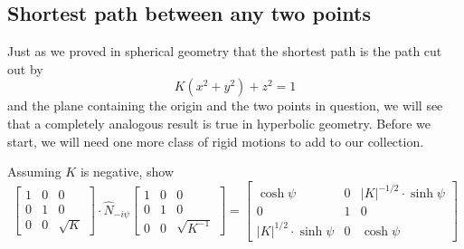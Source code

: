 \documentclass[handout,newpage,hints,,12pt,noauthor,nooutcomes]{ximera}
\begin{document}
\subsection{Shortest path between any two points}

Just as we proved in spherical geometry that the shortest path is the
path cut out by
\[
K(x^{2}+y^{2})+z^{2}=1
\]
and the plane containing the origin and the two points in question, we
will see that a completely analogous result is true in hyperbolic
geometry. Before we start, we will need one more class of rigid
motions to add to our collection.


\begin{problem}
  Assuming $K$ is negative, show
  \[
  \begin{bmatrix}
    1 & 0 & 0 \\
    0 & 1 & 0 \\
    0 & 0 & \sqrt{K}
  \end{bmatrix}
  \cdot 
  \hat N_{-i\psi}
  \begin{bmatrix}
    1 & 0 & 0 \\
    0 & 1 & 0\\
    0 & 0 & \sqrt{K^{-1}}
  \end{bmatrix}
=
  \begin{bmatrix}
    \cosh\psi & 0 & |K|^{-1/2}\cdot\sinh\psi\\
    0 & 1 & 0\\
    |K|^{1/2}\cdot\sinh\psi & 0 & \cosh\psi
  \end{bmatrix}
  \]
\end{problem}
\end{document}
